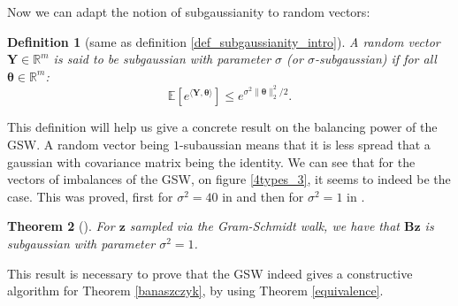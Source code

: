 \documentclass[12pt]{article}
\newtheorem{theorem}{Theorem}
\newtheorem{definition}[theorem]{Definition}
\begin{document}
Now we can adapt the notion of subgaussianity to random vectors:
\begin{definition}[same as definition \ref{def_subgaussianity_intro}]
A random vector $\textbf{Y} \in \mathbb{R}^m$ is said to be subgaussian with parameter $\sigma$ (or $\sigma$-subgaussian) if for all $\bm{\theta} \in \mathbb{R}^m$:
$$\mathbb{E}\left[e^{\langle\textbf{Y},\bm{\theta}\rangle}\right]\leq e^{\sigma^2\|\bm{\theta}\|_2^2/2}.$$
\end{definition}
This definition will help us give a concrete result on the balancing power of the GSW. A random vector being $1$-subaussian means that it is less spread that a gaussian with covariance matrix being the identity. We can see that for the vectors of imbalances of the GSW, on figure \ref{4types_3}, it seems to indeed be the case. This was proved, first for $\sigma^2=40$ in \cite{blues} and then for $\sigma^2=1$ in \cite{harshaw2019balancing}.
\begin{theorem}[\cite{harshaw2019balancing}]
    For $\textbf{z}$ sampled via the Gram-Schmidt walk, we have that $\textbf{Bz}$ is subgaussian with parameter $\sigma^2=1$.%
\end{theorem}
This result is necessary to prove that the GSW indeed gives a constructive algorithm for Theorem \ref{banaszczyk}, by using Theorem \ref{equivalence}.



\end{document}
